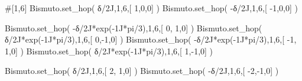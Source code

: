 \documentclass[
  letterpaper,
  DIV=11,
  numbers=noendperiod]{scrreprt}
\newenvironment{Shaded}{\begin{snugshade}}{\end{snugshade}}
\newcommand{\CommentTok}[1]{\textcolor[rgb]{0.37,0.37,0.37}{#1}}
\newcommand{\DecValTok}[1]{\textcolor[rgb]{0.68,0.00,0.00}{#1}}
\newcommand{\NormalTok}[1]{\textcolor[rgb]{0.00,0.23,0.31}{#1}}
\newcommand{\OperatorTok}[1]{\textcolor[rgb]{0.37,0.37,0.37}{#1}}
\newcommand{\OtherTok}[1]{\textcolor[rgb]{0.00,0.23,0.31}{#1}}
\begin{document}
\begin{Shaded}
\begin{Highlighting}[]
\CommentTok{\#[1,6]}
\NormalTok{Bismuto.set\_hop(   δ}\OperatorTok{/}\OtherTok{2J}\NormalTok{,}\DecValTok{1}\NormalTok{,}\DecValTok{6}\NormalTok{,[  }\DecValTok{1}\NormalTok{,}\DecValTok{0}\NormalTok{,}\DecValTok{0}\NormalTok{] ) }
\NormalTok{Bismuto.set\_hop(  }\OperatorTok{{-}}\NormalTok{δ}\OperatorTok{/}\OtherTok{2J}\NormalTok{,}\DecValTok{1}\NormalTok{,}\DecValTok{6}\NormalTok{,[ }\OperatorTok{{-}}\DecValTok{1}\NormalTok{,}\DecValTok{0}\NormalTok{,}\DecValTok{0}\NormalTok{] )}

\NormalTok{Bismuto.set\_hop(  }\OperatorTok{{-}}\NormalTok{δ}\OperatorTok{/}\OtherTok{2J}\OperatorTok{*}\NormalTok{exp(}\OperatorTok{{-}}\OtherTok{1J}\OperatorTok{*}\NormalTok{pi}\OperatorTok{/}\DecValTok{3}\NormalTok{),}\DecValTok{1}\NormalTok{,}\DecValTok{6}\NormalTok{,[  }\DecValTok{0}\NormalTok{, }\DecValTok{1}\NormalTok{,}\DecValTok{0}\NormalTok{] )  }
\NormalTok{Bismuto.set\_hop(   δ}\OperatorTok{/}\OtherTok{2J}\OperatorTok{*}\NormalTok{exp(}\OperatorTok{{-}}\OtherTok{1J}\OperatorTok{*}\NormalTok{pi}\OperatorTok{/}\DecValTok{3}\NormalTok{),}\DecValTok{1}\NormalTok{,}\DecValTok{6}\NormalTok{,[  }\DecValTok{0}\NormalTok{,}\OperatorTok{{-}}\DecValTok{1}\NormalTok{,}\DecValTok{0}\NormalTok{] ) }
\NormalTok{Bismuto.set\_hop(  }\OperatorTok{{-}}\NormalTok{δ}\OperatorTok{/}\OtherTok{2J}\OperatorTok{*}\NormalTok{exp(}\OperatorTok{{-}}\OtherTok{1J}\OperatorTok{*}\NormalTok{pi}\OperatorTok{/}\DecValTok{3}\NormalTok{),}\DecValTok{1}\NormalTok{,}\DecValTok{6}\NormalTok{,[ }\OperatorTok{{-}}\DecValTok{1}\NormalTok{, }\DecValTok{1}\NormalTok{,}\DecValTok{0}\NormalTok{] )  }
\NormalTok{Bismuto.set\_hop(   δ}\OperatorTok{/}\OtherTok{2J}\OperatorTok{*}\NormalTok{exp(}\OperatorTok{{-}}\OtherTok{1J}\OperatorTok{*}\NormalTok{pi}\OperatorTok{/}\DecValTok{3}\NormalTok{),}\DecValTok{1}\NormalTok{,}\DecValTok{6}\NormalTok{,[  }\DecValTok{1}\NormalTok{,}\OperatorTok{{-}}\DecValTok{1}\NormalTok{,}\DecValTok{0}\NormalTok{] )}

\NormalTok{Bismuto.set\_hop(   δ}\OperatorTok{/}\OtherTok{2J}\NormalTok{,}\DecValTok{1}\NormalTok{,}\DecValTok{6}\NormalTok{,[  }\DecValTok{2}\NormalTok{, }\DecValTok{1}\NormalTok{,}\DecValTok{0}\NormalTok{] ) }
\NormalTok{Bismuto.set\_hop(  }\OperatorTok{{-}}\NormalTok{δ}\OperatorTok{/}\OtherTok{2J}\NormalTok{,}\DecValTok{1}\NormalTok{,}\DecValTok{6}\NormalTok{,[ }\OperatorTok{{-}}\DecValTok{2}\NormalTok{,}\OperatorTok{{-}}\DecValTok{1}\NormalTok{,}\DecValTok{0}\NormalTok{] )}


\end{Highlighting}
\end{Shaded}
\end{document}
